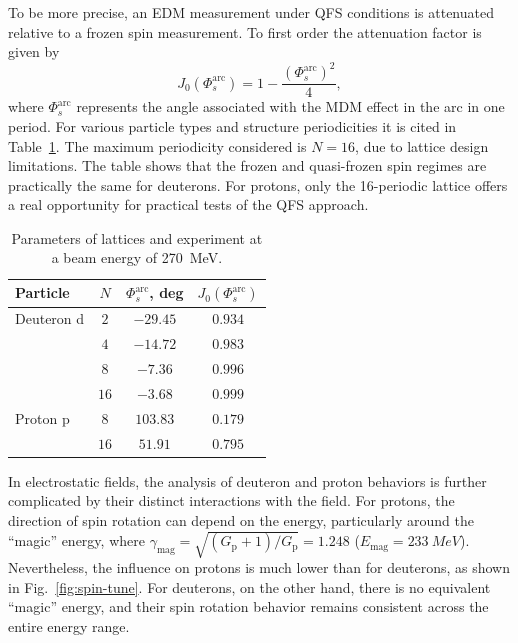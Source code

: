 To be more precise, an EDM measurement under QFS conditions is attenuated
relative to a frozen spin measurement. To first order the attenuation factor
is given by~\cite{Senichev:2023vtx}
\begin{equation}
  J_{0}(\Phi_s^{\mathrm{arc}})=1-\frac{(\Phi_s^{\mathrm{arc}})^2}{4},
  \label{eq:edm_j0}
\end{equation}
where $\Phi_s^{\mathrm{arc}}$ represents the angle associated with the MDM
effect in the arc in one period. For various particle types and structure
periodicities it is cited in Table~\ref{tab:edm}. The maximum periodicity
considered is $N=16$, due to lattice design limitations. The table shows that
the frozen and quasi-frozen spin regimes are practically the same for
deuterons. For protons, only the 16-periodic lattice offers a real opportunity for practical tests of the
QFS approach.

\begin{table}[htbp]
  \centering
  \caption{Parameters of lattices and experiment at a beam energy of
    \SI{270}{MeV}.}
  \label{tab:edm}
  \begin{tabular}{lccc}
    \toprule
    Particle & $N$ & $\Phi_s^{\mathrm{arc}}$, deg & $J_{0}(\Phi_s^{\mathrm{arc}})$ \\
    \midrule
    Deuteron d & $2$ & $-29.45$ & $0.934$ \\
               & $4$ & $-14.72$ & $0.983$ \\
               & $8$ & $-7.36$ & $0.996$ \\
               & $16$ & $-3.68$ & $0.999$ \\
    Proton p & $8$ & $103.83$ & $0.179$ \\
             & $16$ & $51.91$ & $0.795$ \\
    \bottomrule
  \end{tabular}
\end{table}

In electrostatic fields, the analysis of deuteron and proton behaviors is
further complicated by their distinct interactions with the field. For protons,
the direction of spin rotation can depend on the energy, particularly around
the ``magic'' energy, where
$\gamma_{\mathrm{mag}} = \sqrt{(G_{\mathrm{p}}+1)/G_{\mathrm{p}}} = 1.248$
($E_{\mathrm{mag}} = \SI{233}{MeV}$). Nevertheless, the influence on protons is much lower than for deuterons, as
shown in Fig.~\ref{fig:spin-tune}. For
deuterons, on the other hand, there is no equivalent ``magic'' energy, and
their spin rotation behavior remains consistent across the entire energy
range.

